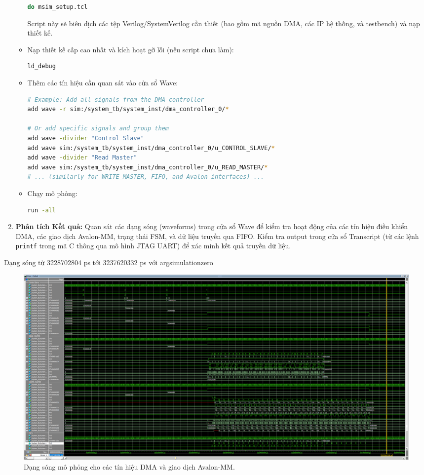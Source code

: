 \begin{enumerate}
\begin{itemize}
\begin{lstlisting}[language=bash, caption={Run QuestaSim setup script}]
do msim_setup.tcl
            \end{lstlisting}
            Script này sẽ biên dịch các tệp Verilog/SystemVerilog cần thiết (bao gồm mã nguồn DMA, các IP hệ thống, và testbench) và nạp thiết kế.
            \item Nạp thiết kế cấp cao nhất và kích hoạt gỡ lỗi (nếu script chưa làm):
            \begin{lstlisting}[language=bash, caption={Load design and enable debug}]
ld_debug
            \end{lstlisting}
            \item Thêm các tín hiệu cần quan sát vào cửa sổ Wave:
            \begin{lstlisting}[language=bash, caption={Add signals to Wave window}]
# Example: Add all signals from the DMA controller
add wave -r sim:/system_tb/system_inst/dma_controller_0/*

# Or add specific signals and group them
add wave -divider "Control Slave"
add wave sim:/system_tb/system_inst/dma_controller_0/u_CONTROL_SLAVE/*
add wave -divider "Read Master"
add wave sim:/system_tb/system_inst/dma_controller_0/u_READ_MASTER/*
# ... (similarly for WRITE_MASTER, FIFO, and Avalon interfaces) ...
            \end{lstlisting}
            \item Chạy mô phỏng:
            \begin{lstlisting}[language=bash, caption={Run simulation}]
run -all
            \end{lstlisting}
        \end{itemize}
    \item \textbf{Phân tích Kết quả:} Quan sát các dạng sóng (waveforms) trong cửa sổ Wave để kiểm tra hoạt động của các tín hiệu điều khiển DMA, các giao dịch Avalon-MM, trạng thái FSM, và dữ liệu truyền qua FIFO. Kiểm tra output trong cửa sổ Transcript (từ các lệnh \texttt{printf} trong mã C thông qua mô hình JTAG UART) để xác minh kết quả truyền dữ liệu.
\end{enumerate}

Dạng sóng từ 3228702804 ps tới 3237620332 ps với argsimulationzero 

\begin{figure}
    \centering
    \includegraphics[width=\linewidth]{Images/04_03_QuestaSimWaveform_argsimulationzero.png}
    \caption{Dạng sóng mô phỏng cho các tín hiệu DMA và giao dịch Avalon-MM.}
    \label{fig:04_03_QuestaSimWaveform}
\end{figure}

